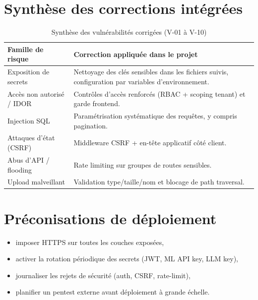 \documentclass[12pt,a4paper]{report}
\begin{document}
\section{Synth\`{e}se des corrections int\'{e}gr\'{e}es}

\begin{table}[H]
\centering
\caption{Synth\`{e}se des vuln\'{e}rabilit\'{e}s corrig\'{e}es (V-01 \`{a} V-10)}
\label{tab:security_summary_compact}
\begin{tabularx}{\textwidth}{l X}
\toprule
\textbf{Famille de risque} & \textbf{Correction appliqu\'{e}e dans le projet} \\
\midrule
Exposition de secrets & Nettoyage des cl\'{e}s sensibles dans les fichiers suivis, configuration par variables d'environnement. \\
Acc\`{e}s non autoris\'{e} / IDOR & Contr\^{o}les d'acc\`{e}s renforc\'{e}s (RBAC + scoping tenant) et garde frontend. \\
Injection SQL & Param\'{e}trisation syst\'{e}matique des requ\^{e}tes, y compris pagination. \\
Attaques d'\'{e}tat (CSRF) & Middleware CSRF + en-t\^{e}te applicatif c\^{o}t\'{e} client. \\
Abus d'API / flooding & Rate limiting sur groupes de routes sensibles. \\
Upload malveillant & Validation type/taille/nom et blocage de path traversal. \\
\bottomrule
\end{tabularx}
\end{table}

\section{Pr\'{e}conisations de d\'{e}ploiement}

\begin{itemize}
  \item imposer HTTPS sur toutes les couches expos\'{e}es,
  \item activer la rotation p\'{e}riodique des secrets (JWT, ML API key, LLM key),
  \item journaliser les rejets de s\'{e}curit\'{e} (auth, CSRF, rate-limit),
  \item planifier un pentest externe avant d\'{e}ploiement \`{a} grande \'{e}chelle.
\end{itemize}


\end{document}
